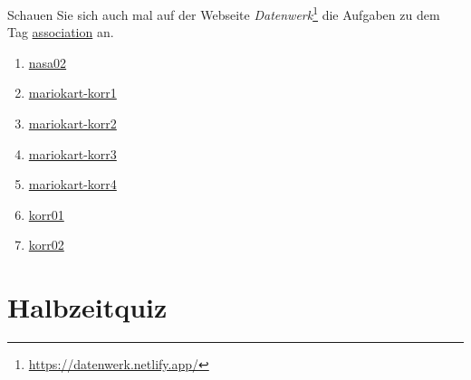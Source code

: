 \documentclass[
  letterpaper,
]{scrbook}
\providecommand{\tightlist}{%
  \setlength{\itemsep}{0pt}\setlength{\parskip}{0pt}}\usepackage{longtable,booktabs,array}
\theoremstyle{definition}
\theoremstyle{definition}
\theoremstyle{definition}
\theoremstyle{remark}
\begin{document}
Schauen Sie sich auch mal auf der Webseite \emph{Datenwerk}\footnote{\url{https://datenwerk.netlify.app/}}
die Aufgaben zu dem Tag
\href{https://datenwerk.netlify.app/\#category=association}{association}
an.

\begin{enumerate}
\def\labelenumi{\arabic{enumi}.}
\tightlist
\item
  \href{https://datenwerk.netlify.app/posts/nasa02/nasa02.html}{nasa02}
\item
  \href{https://datenwerk.netlify.app/posts/mariokart-korr1/mariokart-korr1.html}{mariokart-korr1}
\item
  \href{https://datenwerk.netlify.app/posts/mariokart-korr2/mariokart-korr2.html}{mariokart-korr2}
\item
  \href{https://datenwerk.netlify.app/posts/mariokart-korr3/mariokart-korr3.html}{mariokart-korr3}
\item
  \href{https://datenwerk.netlify.app/posts/mariokart-korr4/mariokart-korr4.html}{mariokart-korr4}
\item
  \href{https://datenwerk.netlify.app/posts/korr01/korr01.html}{korr01}
\item
  \href{https://datenwerk.netlify.app/posts/korr02/korr02.html}{korr02}
\end{enumerate}

\section{Halbzeitquiz}\label{halbzeitquiz}
\end{document}
